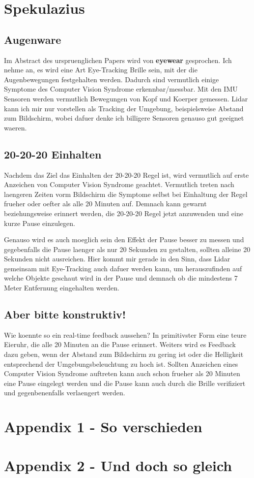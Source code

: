 \section{Spekulazius}

\subsection{Augenware}

Im Abstract des urspruenglichen Papers wird von \textbf{eyewear} gesprochen. Ich nehme an, es wird eine Art Eye-Tracking Brille sein, mit der die
Augenbewegungen festgehalten werden. Dadurch sind vermutlich einige Symptome des Computer Vision Syndrome erkennbar/messbar. Mit den IMU Sensoren
werden vermutlich Bewegungen von Kopf und Koerper gemessen. Lidar kann ich mir nur vorstellen als Tracking der Umgebung, 
beispielsweise Abstand zum Bildschirm, wobei dafuer denke ich billigere Sensoren genauso gut geeignet waeren.

\subsection{20-20-20 Einhalten}

Nachdem das Ziel das Einhalten der 20-20-20 Regel ist, wird vermutlich auf erste Anzeichen von Computer Vision Syndrome geachtet. 
Vermutlich treten nach laengeren Zeiten vorm Bildschirm die Symptome selbst bei Einhaltung der Regel frueher oder oefter als alle 20 Minuten auf.
Demnach kann gewarnt beziehungsweise erinnert werden, die 20-20-20 Regel jetzt anzuwenden und eine kurze Pause einzulegen.

Genauso wird es auch moeglich sein den Effekt der Pause besser zu messen und gegebenfalls die Pause laenger als nur 20 Sekunden
zu gestalten, sollten alleine 20 Sekunden nicht ausreichen. Hier kommt mir gerade in den Sinn, dass Lidar gemeinsam mit Eye-Tracking auch 
dafuer werden kann, um herauszufinden auf welche Objekte geschaut wird in der Pause und demnach ob die mindestens 7 Meter Entfernung 
eingehalten werden.

\subsection{Aber bitte konstruktiv!}

Wie koennte so ein real-time feedback aussehen? In primitivster Form eine teure Eieruhr, die alle 20 Minuten an die Pause erinnert.
Weiters wird es Feedback dazu geben, wenn der Abstand zum Bildschirm zu gering ist oder die Helligkeit entsprechend der Umgebungsbeleuchtung
zu hoch ist. Sollten Anzeichen eines Computer Vision Syndrome auftreten kann auch schon frueher als 20 Minuten eine Pause eingelegt werden
und die Pause kann auch durch die Brille verifiziert und gegenbenenfalls verlaengert werden.

\section{Appendix 1 - So verschieden}

\section{Appendix 2 - Und doch so gleich}

